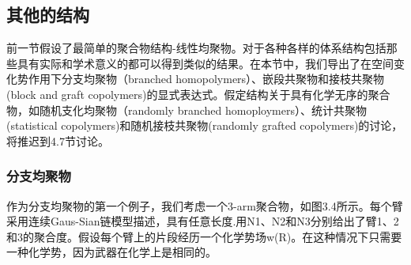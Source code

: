 \subsection{其他的结构}
前一节假设了最简单的聚合物结构-线性均聚物。对于各种各样的体系结构包括那些具有实际和学术意义的都可以得到类似的结果。在本节中，我们导出了在空间变化势作用下分支均聚物（branched homopolymers）、嵌段共聚物和接枝共聚物(block and graft copolymers)的显式表达式。假定结构关于具有化学无序的聚合物，如随机支化均聚物（randomly branched homoploymers）、统计共聚物(statistical copolymers)和随机接枝共聚物(randomly grafted copolymers)的讨论，将推迟到4.7节讨论。
\subsubsection{分支均聚物}
作为分支均聚物的第一个例子，我们考虑一个3-arm聚合物，如图3.4所示。每个臂采用连续Gaus-Sian链模型描述，具有任意长度.用N1、N2和N3分别给出了臂1、2和3的聚合度。假设每个臂上的片段经历一个化学势场w(R)。在这种情况下只需要一种化学势，因为武器在化学上是相同的。

